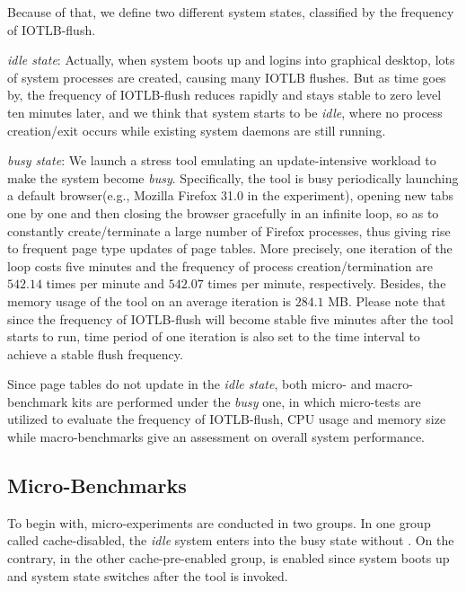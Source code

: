 Because of that, we define two different system states, classified by the frequency of IOTLB-flush.

\emph{idle state}: Actually, when system boots up and logins into graphical desktop, lots of system processes are created, causing many IOTLB flushes. But as time goes by, the frequency of IOTLB-flush reduces rapidly and stays stable to zero level ten minutes later, and we think that system starts to be \emph{idle}, where no process creation/exit occurs while existing system daemons are still running.

\emph{busy state}: We launch a stress tool emulating an update-intensive workload to make the system become \emph{busy}. Specifically, the tool is busy periodically launching a default browser(e.g., Mozilla Firefox 31.0 in the experiment), opening new tabs one by one and then closing the browser gracefully in an infinite loop, so as to constantly create/terminate a large number of Firefox processes, thus giving rise to frequent page type updates of page tables. More precisely, one iteration of the loop costs five minutes and the frequency of process creation/termination are $542.14$ times per minute and $542.07$ times per minute, respectively. Besides, the memory usage of the tool on an average iteration is $284.1$ MB. Please note that since the frequency of IOTLB-flush will become stable five minutes after the tool starts to run, time period of one iteration is also set to the time interval to achieve a stable flush frequency.

Since page tables do not update in the \emph{idle state}, both micro- and macro-benchmark kits are performed under the \emph{busy} one, in which micro-tests are utilized to evaluate the frequency of IOTLB-flush, CPU usage and memory size while macro-benchmarks give an assessment on overall system performance.

\subsection{Micro-Benchmarks}

To begin with, micro-experiments are conducted in two groups. In one group called cache-disabled, the \emph{idle} system enters into the busy state without \name. On the contrary, in the other cache-pre-enabled group, \name is enabled since system boots up and system state switches after the tool is invoked.

